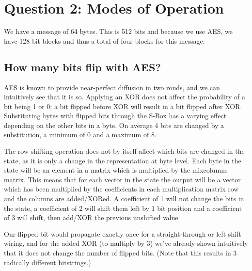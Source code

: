 \documentclass{article}
\begin{document}



\section{Question 2: Modes of Operation}

We have a message of 64 bytes. This is 512 bits and because we use AES, we have 128 bit blocks and thus a total of four blocks for this message.

\subsection{How many bits flip with AES?}
AES is known to provide near-perfect diffusion in two rouds, and we can intuitively see that it is so.
Applying an XOR does not affect the probability of a bit being 1 or 0; a bit flipped before XOR will result in a bit flipped after XOR.
Substituting bytes with flipped bits through the S-Box has a varying effect depending on the other bits in a byte.
On average 4 bits are changed by a substitution, a minimum of 0 and a maximum of 8.

The row shifting operation does not by itself affect which bits are changed in the state, as it is only a change in the representation at byte level.
Each byte in the state will be an element in a matrix which is multiplied by the mixcolumns matrix.
This means that for each vector in the state the output will be a vector which has been multiplied by the coefficients in each multiplication matrix row and the columns are added/XORed.
A coefficient of 1 will not change the bits in the state, a coefficient of 2 will shift them left by 1 bit position and a coefficient of 3 will shift, then add/XOR the previous unshifted value.

Our flipped bit would propagate exactly once for a straight-through or left shift wiring, and for the added XOR (to multiply by 3) we've already shown intuitively that it does not change the number of flipped bits.
(Note that this results in 3 radically different bitstrings.)
\end{document}

